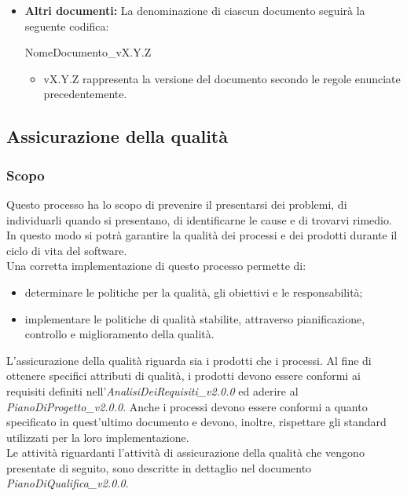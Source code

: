 \documentclass[11pt,a4paper]{article}
\begin{document}
{\begin{itemize}
		\begin{itemize}
			\item X rappresenta la data del verbale.
		\end{itemize}
		
		\item \textbf{Altri documenti:} La denominazione di ciascun documento seguirà la seguente codifica:
		\begin{center}
			NomeDocumento\_vX.Y.Z
		\end{center}
		
		\begin{itemize}
			\item vX.Y.Z rappresenta la versione del documento secondo le regole enunciate precedentemente.
		\end{itemize}
		
	\end{itemize}
	
	\newpage
	
	\subsection{Assicurazione della qualità}
	\subsubsection{Scopo}
	Questo processo ha lo scopo di prevenire il presentarsi dei problemi, di individuarli quando si presentano, di identificarne le cause e di trovarvi rimedio. In questo modo si potrà garantire la qualità dei processi e dei prodotti durante il ciclo di vita del software.
	\\
Una corretta implementazione di questo processo permette di:
	\begin{itemize}
		\item determinare le politiche per la qualità, gli obiettivi e le responsabilità;
		\item implementare le politiche di qualità stabilite, attraverso pianificazione, controllo e miglioramento della qualità. 
	\end{itemize}
	
L'assicurazione della qualità riguarda sia i prodotti che i processi. Al fine di ottenere specifici attributi di qualità, i prodotti devono essere conformi ai requisiti definiti nell'\textit{AnalisiDeiRequisiti\_v2.0.0} ed aderire al \textit{PianoDiProgetto\_v2.0.0}. Anche i processi devono essere conformi a quanto specificato in quest'ultimo documento e devono, inoltre, rispettare gli standard utilizzati per la loro implementazione. \\
Le attività riguardanti l'attività di assicurazione della qualità che vengono presentate di seguito, sono descritte in dettaglio nel documento \textit{PianoDiQualifica\_v2.0.0}.

}
\end{document}
